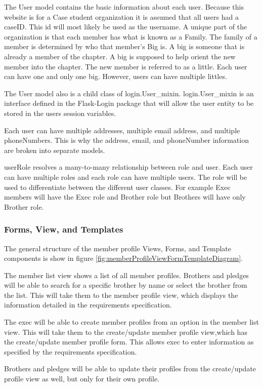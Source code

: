 \documentclass{article}
\begin{document}
The User model contains the basic information about each user. Because this website is for a Case student organization it is assumed that all users had a caseID. This id will most likely be used as the username. A unique part of the organization is that each member has what is known as a Family. The family of a member is determined by who that member's Big is. A big is someone that is already a member of the chapter. A big is supposed to help orient the new member into the chapter. The new member is referred to as a little. Each user can have one and only one big. However, users can have multiple littles.

The User model also is a child class of login.User\_mixin. login.User\_mixin is an interface defined in the Flask-Login package that will allow the user entity to be stored in the users session variables.

Each user can have multiple addresses, multiple email address, and multiple phoneNumbers. This is why the address, email, and phoneNumber information are broken into separate models.

userRole resolves a many-to-many relationship between role and user. Each user can have multiple roles and each role can have multiple users. The role will be used to differentiate between the different user classes. For example Exec members will have the Exec role and Brother role but Brothers will have only Brother role.

\subsubsection{Forms, View, and Templates}

The general structure of the member profile Views, Forms, and Template components is show in figure \ref{fig:memberProfileViewFormTemplateDiagram}.

The member list view shows a list of all member profiles. Brothers and pledges will be able to search for a specific brother by name or select the brother from the list. This will take them to the member profile view, which displays the information detailed in the requirements specification.

The exec will be able to create member profiles from an option in the member list view. This will take them to the create/update member profile view,which has the create/update member profile form. This allows exec to enter information as specified by the requirements specification.

Brothers and pledges will be able to update their profiles from the create/update profile view as well, but only for their own profile.
\end{document}
